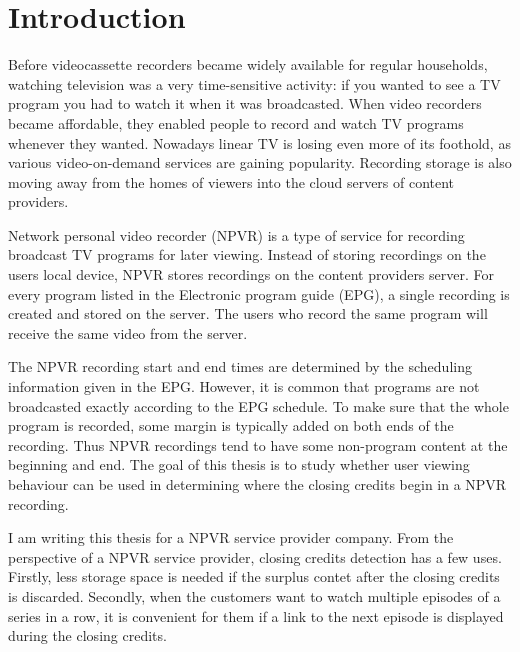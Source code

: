\section{Introduction} \label{sec:intro}

Before videocassette recorders became widely available for regular households, watching television was a very time-sensitive activity: if you wanted to see a TV program you had to watch it when it was broadcasted. When video recorders became affordable, they enabled people to record and watch TV programs whenever they wanted. Nowadays linear TV is losing even more of its foothold, as various video-on-demand services are gaining popularity. %
Recording storage is also moving away from the homes of viewers into the cloud servers of content providers.

Network personal video recorder (NPVR) is a type of service for recording broadcast TV programs for later viewing. Instead of storing recordings on the users local device, NPVR stores recordings on the content providers server. For every program listed in the Electronic program guide (EPG), a single recording is created and stored on the server. The users who record the same program will receive the same video from the server.

The NPVR recording start and end times are determined by the scheduling information given in the EPG. However, it is common that programs are not broadcasted exactly according to the EPG schedule. To make sure that the whole program is recorded, some margin is typically added on both ends of the recording. Thus NPVR recordings tend to have some non-program content at the beginning and end. The goal of this thesis is to study whether user viewing behaviour can be used in determining where the closing credits begin in a NPVR recording.

I am writing this thesis for a  NPVR service provider company. From the perspective of a NPVR service provider, closing credits detection has a few uses. Firstly, less storage space is needed if the surplus contet after the closing credits is discarded. Secondly, when the customers want to watch multiple episodes of a series in a row, it is convenient for them if a link to the next episode is displayed during the closing credits.



